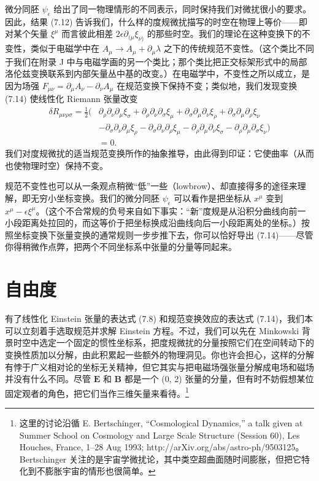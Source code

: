 微分同胚 $\psi_{\epsilon}$ 给出了同一物理情形的不同表示，同时保持我们对微扰很小的要求。因此，结果 (7.12) 告诉我们，什么样的度规微扰描写的时空在物理上等价——即对某个矢量 $\xi^{\mu}$ 而言彼此相差 $2\epsilon\partial_{(\mu}\xi_{\nu)}$ 的那些时空。我们的理论在这种变换下的不变性，类似于电磁学中在 $A_{\mu} \to A_{\mu} + \partial_{\mu}\lambda$ 之下的传统规范不变性。（这个类比不同于我们在附录 J 中与电磁学画的另一个类比；那个类比把正交标架形式中的局部洛伦兹变换联系到内部矢量丛中基的改变。）在电磁学中，不变性之所以成立，是因为场强 $F_{\mu\nu} = \partial_{\mu}A_{\nu} - \partial_{\nu}A_{\mu}$ 在规范变换下保持不变；类似地，我们发现变换 (7.14) 使线性化 Riemann 张量改变
\begin{align*}
\delta R_{\mu\nu\rho\sigma} = \frac{1}{2}(&\partial_{\rho}\partial_{\nu}\partial_{\mu}\xi_{\sigma} + \partial_{\rho}\partial_{\nu}\partial_{\sigma}\xi_{\mu} + \partial_{\sigma}\partial_{\mu}\partial_{\nu}\xi_{\rho} + \partial_{\sigma}\partial_{\mu}\partial_{\rho}\xi_{\nu} \\
&- \partial_{\sigma}\partial_{\nu}\partial_{\mu}\xi_{\rho} - \partial_{\sigma}\partial_{\nu}\partial_{\rho}\xi_{\mu} - \partial_{\rho}\partial_{\mu}\partial_{\nu}\xi_{\sigma} - \partial_{\rho}\partial_{\mu}\partial_{\sigma}\xi_{\nu}) \\
&= 0.
\tag{7.15}
\end{align*}
我们对度规微扰的适当规范变换所作的抽象推导，由此得到印证：它使曲率（从而也使物理时空）保持不变。

规范不变性也可以从一条观点稍微“低”一些（lowbrow）、却直接得多的途径来理解，即无穷小坐标变换。我们的微分同胚 $\psi_{\epsilon}$ 可以看作是把坐标从 $x^{\mu}$ 变到 $x^{\mu} - \epsilon\xi^{\mu}$。（这个不合常规的负号来自如下事实：“新”度规是从沿积分曲线向前一小段距离处拉回的，而这等价于把坐标换成沿曲线向后一小段距离处的坐标。）按照坐标变换下张量变换的通常规则一步步推下去，你可以恰好导出 (7.14)——尽管你得稍微作点弊，把两个不同坐标系中张量的分量等同起来。

\section{自由度}

有了线性化 Einstein 张量的表达式 (7.8) 和规范变换效应的表达式 (7.14)，我们本可以立刻着手选取规范并求解 Einstein 方程。不过，我们可以先在 Minkowski 背景时空中选定一个固定的惯性坐标系，把度规微扰的分量按照它们在空间转动下的变换性质加以分解，由此积累起一些额外的物理洞见。你也许会担心，这样的分解有悖于广义相对论的坐标无关精神，但它其实与把电磁场强张量分解成电场和磁场并没有什么不同。尽管 $\mathbf{E}$ 和 $\mathbf{B}$ 都是一个 (0, 2) 张量的分量，但有时不妨假想某位固定观者的角色，把它们当作三维矢量来看待。\footnote{这里的讨论沿循 E. Bertschinger, “Cosmological Dynamics,” a talk given at Summer School on Cosmology and Large Scale Structure (Session 60), Les Houches, France, 1--28 Aug 1993; http://arXiv.org/abs/astro-ph/9503125。Bertschinger 关注的是宇宙学微扰论，其中类空超曲面随时间膨胀，但把它特化到不膨胀宇宙的情形也很简单。}

